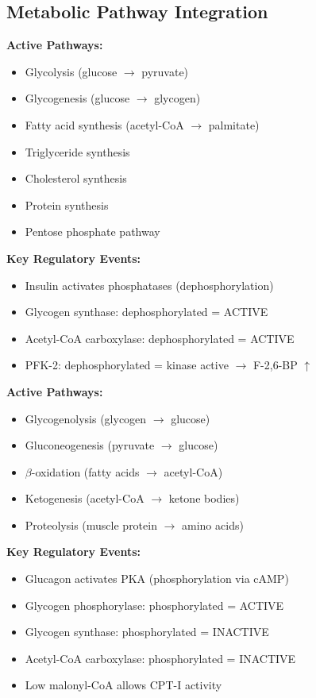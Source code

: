 \subsection{Metabolic Pathway Integration}

\begin{tcolorbox}[colback=blue!5, colframe=blue!70!black, title=\textbf{The Fed State (Insulin Dominant)}]
\textbf{Active Pathways:}
\begin{itemize}
    \item Glycolysis (glucose $\rightarrow$ pyruvate)
    \item Glycogenesis (glucose $\rightarrow$ glycogen)
    \item Fatty acid synthesis (acetyl-CoA $\rightarrow$ palmitate)
    \item Triglyceride synthesis
    \item Cholesterol synthesis
    \item Protein synthesis
    \item Pentose phosphate pathway
\end{itemize}

\textbf{Key Regulatory Events:}
\begin{itemize}
    \item Insulin activates phosphatases (dephosphorylation)
    \item Glycogen synthase: dephosphorylated = ACTIVE
    \item Acetyl-CoA carboxylase: dephosphorylated = ACTIVE
    \item PFK-2: dephosphorylated = kinase active $\rightarrow$ F-2,6-BP $\uparrow$
\end{itemize}
\end{tcolorbox}

\begin{tcolorbox}[colback=orange!5, colframe=orange!70!black, title=\textbf{The Fasted State (Glucagon Dominant)}]
\textbf{Active Pathways:}
\begin{itemize}
    \item Glycogenolysis (glycogen $\rightarrow$ glucose)
    \item Gluconeogenesis (pyruvate $\rightarrow$ glucose)
    \item $\beta$-oxidation (fatty acids $\rightarrow$ acetyl-CoA)
    \item Ketogenesis (acetyl-CoA $\rightarrow$ ketone bodies)
    \item Proteolysis (muscle protein $\rightarrow$ amino acids)
\end{itemize}

\textbf{Key Regulatory Events:}
\begin{itemize}
    \item Glucagon activates PKA (phosphorylation via cAMP)
    \item Glycogen phosphorylase: phosphorylated = ACTIVE
    \item Glycogen synthase: phosphorylated = INACTIVE
    \item Acetyl-CoA carboxylase: phosphorylated = INACTIVE
    \item Low malonyl-CoA allows CPT-I activity
\end{itemize}
\end{tcolorbox}

